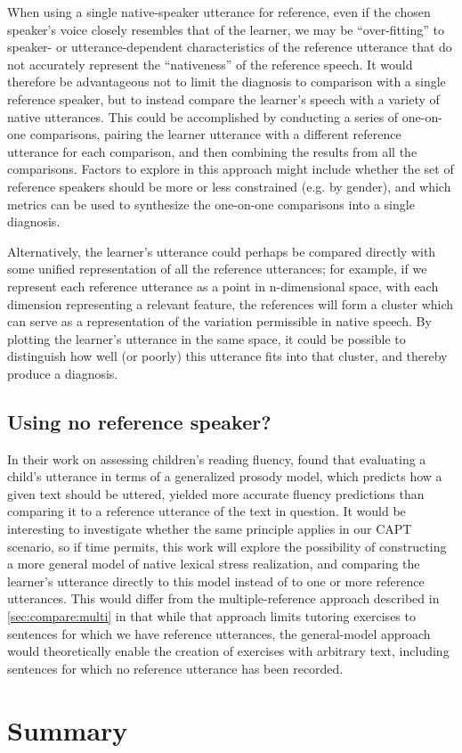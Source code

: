 	When using a single native-speaker utterance for reference, even if the chosen  speaker's voice closely resembles that of the learner, we may be ``over-fitting'' to speaker- or utterance-dependent characteristics of the reference utterance that do not accurately represent the ``nativeness'' of the reference speech. It would therefore be advantageous not to limit the diagnosis to comparison with a single reference speaker, but to instead compare the learner's speech with a variety of native utterances. This could be accomplished by conducting a series of one-on-one comparisons, pairing the learner utterance with a different reference utterance for each comparison, and then combining the results from all the comparisons.  Factors to explore in this approach might include whether the set of reference speakers should be more or less constrained (e.g. by gender), and which metrics can be used to synthesize the one-on-one comparisons into a single diagnosis.
	
	Alternatively, the learner's utterance could perhaps be compared directly with some unified representation of all the reference utterances; for example, if we represent each reference utterance as a point in n-dimensional space, with each dimension representing a relevant feature, the references will form a cluster which can serve as a representation of the variation permissible in native speech. By plotting the learner's utterance in the same space, it could be possible to distinguish how well (or poorly) this utterance fits into that cluster, and thereby produce a diagnosis.

	
	\subsection{Using no reference speaker?}
	\label{sec:compare:noref}
	
	In their work on assessing children's reading fluency, \textcite{Duong2011} found that evaluating a child's utterance in terms of a generalized prosody model, which predicts how a given text should be uttered, yielded more accurate fluency predictions than comparing it to a reference utterance of the text in question. It would be interesting to investigate whether the same principle applies in our CAPT scenario, so if time permits, this work will explore the possibility of constructing a more general model of native lexical stress realization, and comparing the learner's utterance directly to this model instead of to one or more reference utterances. This would differ from the multiple-reference approach described in \cref{sec:compare:multi} in that while that approach limits tutoring exercises to sentences for which we have reference utterances, the general-model approach would theoretically enable the creation of exercises with arbitrary text, including sentences for which no reference utterance has been recorded.

		
\section{Summary}
\label{sec:diag:summary}